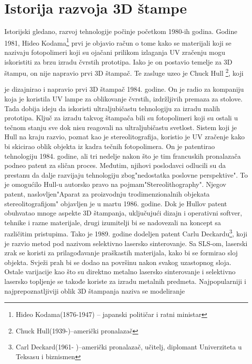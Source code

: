 \documentclass[a4paper]{article}
\begin{document}
\section{Istorija razvoja 3D štampe \cite{c}}

\bigbreak Istorijski gledano, razvoj tehnologije počinje početkom 1980-ih godina. Godine
1981, Hideo Kodama\footnote{Hideo Kodama(1876-1947) – japanski političar i ratni
ministar} prvi je objavio račun o tome kako se materijali koji se nazivaju fotopolimeri
koji su ojačani prilikom izlaganja UV zračenju mogu iskoristiti za brzu izradu čvrstih
prototipa. Iako je on postavio temelje za 3D štampu, on nije napravio prvi 3D štampač.
Te zasluge uzeo je Chuck Hull \footnote{Chuck Hull(1939-)–američki pronalazač}, koji

je dizajnirao i napravio prvi 3D štampač 1984. godine. On je radio za kompaniju koja je
koristila UV lampe za oblikovanje čvrstih, izdržljivih premaza za stolove. Tada dobija
ideju da iskoristi ultraljubičastu tehnologiju za izradu malih prototipa.
\bigbreak Ključ za izradu takvog štampača bili su fotopolimeri koji su ostali u tečnom
stanju sve dok nisu reagovali na ultraljubičastu svetlost. Sistem koji je Hull na kraju
razvio, poznat kao je stereolitografija, koristio je UV zračenje kako bi skicirao oblik
objekta iz kadra tečnih fotopolimera.
\bigbreak On je patentirao tehnologiju 1984. godine, ali tri nedelje nakon što je tim
francuskih pronalazača podneo patent za sličan proces. Međutim, njihovi poslodavci
odlucili su da prestanu da dalje razvijaju tehnologiju zbog"nedostatka poslovne
perspektive". To je omogućilo Hull-u autorsko pravo na pojmam"Stereolithography".
Njegov patent, naslovljen"Aparat za proizvodnju trodimenzionalnih objekata
stereolitografijom" objavljen je u martu 1986. godine.
\bigbreak Dok je Hullov patent obuhvatao mnoge aspekte 3D štampanja, uključujući
dizajn i operativni softver, tehnike i razne materijale, drugi izumitelji bi se nadovezali na
koncept sa različitim pristupima. Tako je 1989. godine dodeljen patent Carlu
Deckardu\footnote{Carl Deckard(1961- )–američki pronalazač, učitelj, diplomant
Univerziteta u Teksasu i biznismen}, koji je razvio metod pod nazivom selektivno
lasersko sinterovanje. Sa SLS-om, laserski zrak se koristi za prilagođavanje praškastih
materijala, kako bi se formirao sloj objekta. Svježi prah bi se dodao na površinu nakon
svakog uzastopnog sloja. Ostale varijacije kao što su direktno metalno lasersko
sinterovanje i selektivno lasersko topljenje se takođe koriste za izradu metalnih predmeta.
\bigbreak Najpopularniji i najprepoznatljiviji oblik 3D štampanja naziva se modeliranje
\end{document}
